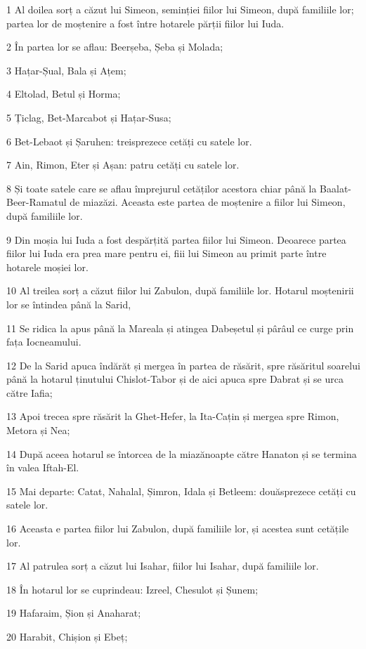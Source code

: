\par 1 Al doilea sorț a căzut lui Simeon, seminției fiilor lui Simeon, după familiile lor; partea lor de moștenire a fost între hotarele părții fiilor lui Iuda.
\par 2 În partea lor se aflau: Beerșeba, Șeba și Molada;
\par 3 Hațar-Șual, Bala și Ațem;
\par 4 Eltolad, Betul și Horma;
\par 5 Țiclag, Bet-Marcabot și Hațar-Susa;
\par 6 Bet-Lebaot și Șaruhen: treisprezece cetăți cu satele lor.
\par 7 Ain, Rimon, Eter și Așan: patru cetăți cu satele lor.
\par 8 Și toate satele care se aflau împrejurul cetăților acestora chiar până la Baalat-Beer-Ramatul de miazăzi. Aceasta este partea de moștenire a fiilor lui Simeon, după familiile lor.
\par 9 Din moșia lui Iuda a fost despărțită partea fiilor lui Simeon. Deoarece partea fiilor lui Iuda era prea mare pentru ei, fiii lui Simeon au primit parte între hotarele moșiei lor.
\par 10 Al treilea sorț a căzut fiilor lui Zabulon, după familiile lor. Hotarul moștenirii lor se întindea până la Sarid,
\par 11 Se ridica la apus până la Mareala și atingea Dabeșetul și pârâul ce curge prin fața Iocneamului.
\par 12 De la Sarid apuca îndărăt și mergea în partea de răsărit, spre răsăritul soarelui până la hotarul ținutului Chislot-Tabor și de aici apuca spre Dabrat și se urca către Iafia;
\par 13 Apoi trecea spre răsărit la Ghet-Hefer, la Ita-Cațin și mergea spre Rimon, Metora și Nea;
\par 14 După aceea hotarul se întorcea de la miazănoapte către Hanaton și se termina în valea Iftah-El.
\par 15 Mai departe: Catat, Nahalal, Șimron, Idala și Betleem: douăsprezece cetăți cu satele lor.
\par 16 Aceasta e partea fiilor lui Zabulon, după familiile lor, și acestea sunt cetățile lor.
\par 17 Al patrulea sorț a căzut lui Isahar, fiilor lui Isahar, după familiile lor.
\par 18 În hotarul lor se cuprindeau: Izreel, Chesulot și Șunem;
\par 19 Hafaraim, Șion și Anaharat;
\par 20 Harabit, Chișion și Ebeț;
